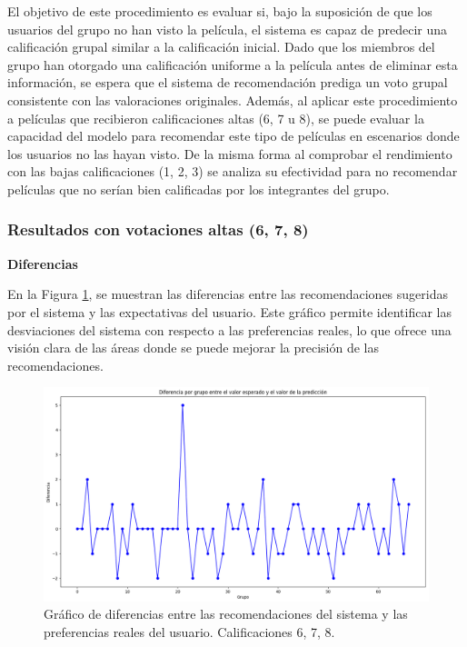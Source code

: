 \documentclass[runningheads,a4paper]{llncs}
\begin{document}
El objetivo de este procedimiento es evaluar si, bajo la suposición de que los usuarios del grupo no han visto la película, el sistema es capaz de predecir una calificación grupal similar a la calificación inicial. Dado que los miembros del grupo han otorgado una calificación uniforme a la película antes de eliminar esta información, se espera que el sistema de recomendación prediga un voto grupal consistente con las valoraciones originales. Además, al aplicar este procedimiento a películas que recibieron calificaciones altas (6, 7 u 8), se puede evaluar la capacidad del modelo para recomendar este tipo de películas en escenarios donde los usuarios no las hayan visto. De la misma forma al comprobar el rendimiento con las bajas calificaciones (1, 2, 3) se analiza su efectividad para no recomendar películas que no serían bien calificadas por los integrantes del grupo.

\subsubsection{Resultados con votaciones altas (6, 7, 8)\\}

\textbf{Diferencias}

En la Figura \ref{fig:diferencias}, se muestran las diferencias entre las recomendaciones sugeridas por el sistema y las expectativas del usuario. Este gráfico permite identificar las desviaciones del sistema con respecto a las preferencias reales, lo que ofrece una visión clara de las áreas donde se puede mejorar la precisión de las recomendaciones.

\begin{figure}[h]
    \centering
    \includegraphics[width=\columnwidth]{assets/Diferencias678.png}
    \caption{Gráfico de diferencias entre las recomendaciones del sistema y las preferencias reales del usuario. Calificaciones 6, 7, 8.}
    \label{fig:diferencias}
\end{figure}
\end{document}
